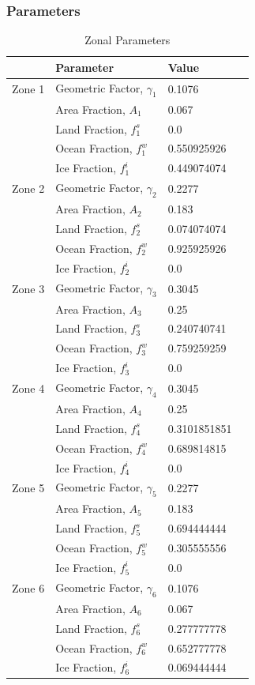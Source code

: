 \documentclass[12pt]{article}
\begin{document}
\subsubsection{Parameters} \label{sec:Parameters}
\begin{table}[H]
    \captionsetup{singlelinecheck = false, justification=justified}
    \caption{Zonal Parameters}
    \begin{tabular}{llll}
    \hline
     & Parameter & Value \\
    \hline
    Zone 1 & Geometric Factor, $\gamma_1$ & 0.1076  \\
     & Area Fraction, $A_1$ & 0.067\\
     & Land Fraction, $f_1^s$ & 0.0 \\
     & Ocean Fraction, $f_1^w$  & 0.550925926 \\ 
     & Ice Fraction, $f_1^i$ & 0.449074074 \\
    \hline
    Zone 2 & Geometric Factor, $\gamma_2$ & 0.2277 \\
     & Area Fraction, $A_2$ & 0.183\\
     & Land Fraction, $f_2^s$ & 0.074074074 \\
     & Ocean Fraction, $f_2^w$ & 0.925925926 \\ 
     & Ice Fraction, $f_2^i$ & 0.0\\
    \hline
    Zone 3 & Geometric Factor, $\gamma_3$ & 0.3045 \\
     & Area Fraction, $A_3$ & 0.25 \\
     & Land Fraction, $f_3^s$ & 0.240740741 \\
     & Ocean Fraction, $f_3^w$ & 0.759259259 \\ 
     & Ice Fraction, $f_3^i$ & 0.0\\
    \hline
    Zone 4 & Geometric Factor, $\gamma_4$ & 0.3045 \\
     & Area Fraction, $A_4$ & 0.25 \\
     & Land Fraction, $f_4^s$ & 0.3101851851 \\
     & Ocean Fraction, $f_4^w$ & 0.689814815 \\ 
     & Ice Fraction, $f_4^i$ & 0.0 \\
    \hline
    Zone 5 & Geometric Factor, $\gamma_5$ & 0.2277 \\
     & Area Fraction, $A_5$ & 0.183 \\
     & Land Fraction, $f_5^s$ & 0.694444444 \\
     & Ocean Fraction, $f_5^w$ & 0.305555556 \\ 
     & Ice Fraction, $f_5^i$ & 0.0 \\
    \hline
    Zone 6 & Geometric Factor, $\gamma_6$ & 0.1076\\
     & Area Fraction, $A_6$ & 0.067 \\
     & Land Fraction, $f_6^s$ & 0.277777778\\
     & Ocean Fraction, $f_6^w$  & 0.652777778\\ 
     & Ice Fraction, $f_6^i$ & 0.069444444\\
    \end{tabular}
    \label{tab:zoneparams}
\end{table}
\FloatBarrier
\end{document}
